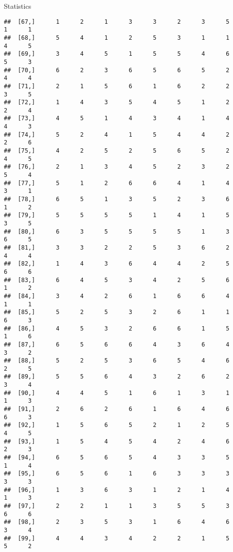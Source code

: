 \documentclass[
  ignorenonframetext,
]{beamer}
\begin{document}
\begin{frame}[fragile]{Statistics}
\begin{verbatim}
##  [67,]      1      2      1      3      3      2      3      5      1      1
##  [68,]      5      4      1      2      5      3      1      1      4      5
##  [69,]      3      4      5      1      5      5      4      6      5      3
##  [70,]      6      2      3      6      5      6      5      2      4      4
##  [71,]      2      1      5      6      1      6      2      2      3      5
##  [72,]      1      4      3      5      4      5      1      2      2      4
##  [73,]      4      5      1      4      3      4      1      4      4      3
##  [74,]      5      2      4      1      5      4      4      2      2      6
##  [75,]      4      2      5      2      5      6      5      2      4      5
##  [76,]      2      1      3      4      5      2      3      2      5      4
##  [77,]      5      1      2      6      6      4      1      4      3      1
##  [78,]      6      5      1      3      5      2      3      6      1      2
##  [79,]      5      5      5      5      1      4      1      5      3      5
##  [80,]      6      3      5      5      5      5      1      3      6      5
##  [81,]      3      3      2      2      5      3      6      2      4      4
##  [82,]      1      4      3      6      4      4      2      5      6      6
##  [83,]      6      4      5      3      4      2      5      6      1      2
##  [84,]      3      4      2      6      1      6      6      4      1      1
##  [85,]      5      2      5      3      2      6      1      1      6      3
##  [86,]      4      5      3      2      6      6      1      5      1      6
##  [87,]      6      5      6      6      4      3      6      4      3      2
##  [88,]      5      2      5      3      6      5      4      6      2      5
##  [89,]      5      5      6      4      3      2      6      2      3      4
##  [90,]      4      4      5      1      6      1      3      1      1      3
##  [91,]      2      6      2      6      1      6      4      6      6      3
##  [92,]      1      5      6      5      2      1      2      5      4      5
##  [93,]      1      5      4      5      4      2      4      6      2      3
##  [94,]      6      5      6      5      4      3      3      5      1      4
##  [95,]      6      5      6      1      6      3      3      3      3      3
##  [96,]      1      3      6      3      1      2      1      4      1      3
##  [97,]      2      2      1      1      3      5      5      3      6      6
##  [98,]      2      3      5      3      1      6      4      6      3      4
##  [99,]      4      4      3      4      2      2      1      5      5      2

\end{verbatim}
\end{frame}
\end{document}
